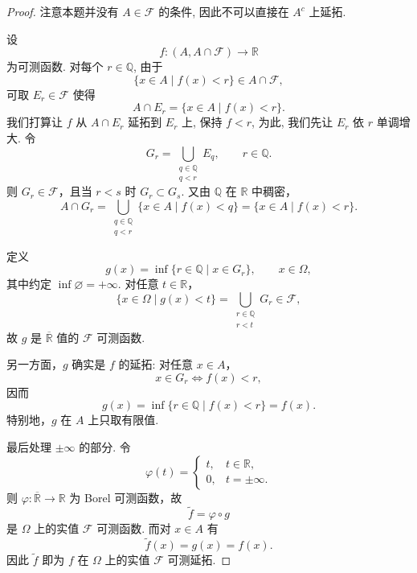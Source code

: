         \begin{proof}
            注意本题并没有 $A\in\mathcal{F}$ 的条件, 因此不可以直接在 $A^c$ 上延拓.

            设
            \[
                f:(A,A\cap\mathcal{F})\longrightarrow\mathbb{R}
            \]
            为可测函数. 对每个 $r\in\mathbb{Q}$, 由于
            \[
                \{x\in A\mid f(x)<r\}\in A\cap\mathcal{F},
            \]
            可取 $E_r\in\mathcal{F}$ 使得
            \[
                A\cap E_r=\{x\in A\mid f(x)<r\}.
            \]
            我们打算让 $f$ 从 $A\cap E_r$ 延拓到 $E_r$ 上, 保持 $f<r$, 为此, 我们先让 $E_r$ 依 $r$ 单调增大. 
            令
            \[
                G_r=\bigcup_{\substack{q\in\mathbb{Q}\\q<r}}E_q,\qquad r\in\mathbb{Q}.
            \]
            则 $G_r\in\mathcal{F}$，且当 $r<s$ 时 $G_r\subset G_s$. 又由 $\mathbb{Q}$ 在 $\mathbb{R}$ 中稠密，
            \[
                A\cap G_r
                =\bigcup_{\substack{q\in\mathbb{Q}\\q<r}}\{x\in A\mid f(x)<q\}
                =\{x\in A\mid f(x)<r\}.
            \]

            定义
            \[
                g(x)=\inf\{r\in\mathbb{Q}\mid x\in G_r\},\qquad x\in\Omega,
            \]
            其中约定 $\inf\varnothing=+\infty$. 对任意 $t\in\mathbb{R}$，
            \[
                \{x\in\Omega\mid g(x)<t\}
                =\bigcup_{\substack{r\in\mathbb{Q}\\r<t}}G_r\in\mathcal{F},
            \]
            故 $g$ 是 $\overline{\mathbb{R}}$ 值的 $\mathcal{F}$ 可测函数.

            另一方面，$g$ 确实是 $f$ 的延拓: 对任意 $x\in A$，
            \[
                x\in G_r\iff f(x)<r,
            \]
            因而
            \[
                g(x)
                =\inf\{r\in\mathbb{Q}\mid f(x)<r\}
                =f(x).
            \]
            特别地，$g$ 在 $A$ 上只取有限值.

            最后处理 $\pm\infty$ 的部分. 令
            \[
                \varphi(t)=
                \begin{cases}
                    t,&t\in\mathbb{R},\\
                    0,&t=\pm\infty.
                \end{cases}
            \]
            则 $\varphi:\overline{\mathbb{R}}\to\mathbb{R}$ 为 Borel 可测函数，故
            \[
                \widetilde f=\varphi\circ g
            \]
            是 $\Omega$ 上的实值 $\mathcal{F}$ 可测函数. 而对 $x\in A$ 有
            \[
                \widetilde f(x)=g(x)=f(x).
            \]
            因此 $\widetilde f$ 即为 $f$ 在 $\Omega$ 上的实值 $\mathcal{F}$ 可测延拓.
        \end{proof}
